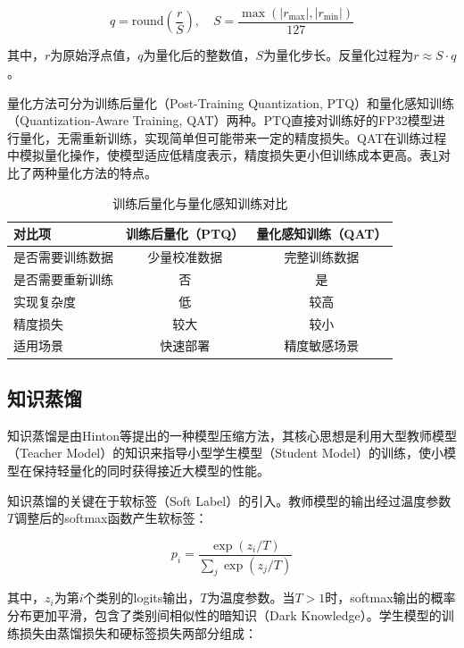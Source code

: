\begin{equation}
	q = \text{round}\left(\frac{r}{S}\right), \quad S = \frac{\max(|r_{\max}|, |r_{\min}|)}{127}
	\label{eq:quantization}
\end{equation}

其中，$r$为原始浮点值，$q$为量化后的整数值，$S$为量化步长。反量化过程为$r \approx S \cdot q$。

量化方法可分为训练后量化（Post-Training Quantization, PTQ）和量化感知训练（Quantization-Aware Training, QAT）两种。PTQ直接对训练好的FP32模型进行量化，无需重新训练，实现简单但可能带来一定的精度损失。QAT在训练过程中模拟量化操作，使模型适应低精度表示，精度损失更小但训练成本更高。表\ref{tab:quantization}对比了两种量化方法的特点。

\begin{table}[htbp]
	\centering
	\caption{训练后量化与量化感知训练对比}
	\label{tab:quantization}
	\begin{tabular}{lcc}
		\toprule
		对比项 & 训练后量化（PTQ） & 量化感知训练（QAT） \\
		\midrule
		是否需要训练数据 & 少量校准数据 & 完整训练数据 \\
		是否需要重新训练 & 否 & 是 \\
		实现复杂度 & 低 & 较高 \\
		精度损失 & 较大 & 较小 \\
		适用场景 & 快速部署 & 精度敏感场景 \\
		\bottomrule
	\end{tabular}
\end{table}

\subsection{知识蒸馏}

知识蒸馏是由Hinton等\cite{hinton2015distilling}提出的一种模型压缩方法，其核心思想是利用大型教师模型（Teacher Model）的知识来指导小型学生模型（Student Model）的训练，使小模型在保持轻量化的同时获得接近大模型的性能。

知识蒸馏的关键在于软标签（Soft Label）的引入。教师模型的输出经过温度参数$T$调整后的softmax函数产生软标签：

\begin{equation}
	p_i = \frac{\exp(z_i / T)}{\sum_{j} \exp(z_j / T)}
	\label{eq:softmax_temperature}
\end{equation}

其中，$z_i$为第$i$个类别的logits输出，$T$为温度参数。当$T > 1$时，softmax输出的概率分布更加平滑，包含了类别间相似性的暗知识（Dark Knowledge）。学生模型的训练损失由蒸馏损失和硬标签损失两部分组成：


